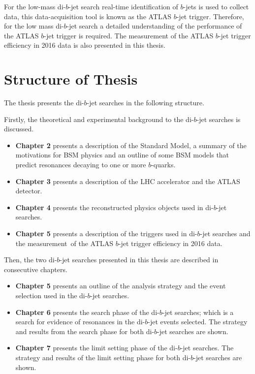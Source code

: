 For the low-mass di-$b$-jet search real-time identification of $b$-jets is used to collect data,
this data-acquisition tool is known as the ATLAS $b$-jet trigger.
Therefore, for the low mass di-$b$-jet search a detailed understanding of the performance of the ATLAS $b$-jet trigger is required.
The measurement of the ATLAS $b$-jet trigger efficiency in 2016 data is also presented in this thesis.

\section{Structure of Thesis}

The thesis presents the di-$b$-jet searches in the following structure.

\noindent
Firstly, the theoretical and experimental background to the di-$b$-jet searches is discussed.
\begin{itemize}[leftmargin=*]
\item\textbf{Chapter 2} presents a description of the Standard Model,
  a summary of the motivations for BSM physics and
  an outline of some BSM models that predict resonances
  decaying to one or more $b$-quarks.\vspace{0.5em}
\item\textbf{Chapter 3} presents a description of the LHC accelerator and the ATLAS detector.\vspace{0.5em}
\item\textbf{Chapter 4} presents the reconstructed physics objects used in di-$b$-jet searches. \vspace{0.5em}
\item\textbf{Chapter 5} presents a description of the triggers used in di-$b$-jet searches
  and the measurement~of the ATLAS $b$-jet trigger efficiency in 2016 data. \vspace{0.5em}
\end{itemize}
\noindent
Then, the two di-$b$-jet searches presented in this thesis are described in consecutive chapters.
\begin{itemize}[leftmargin=*]
\item\textbf{Chapter 5} presents an outline of the analysis strategy and the event selection used in the \mbox{di-$b$-jet} searches.\vspace{0.5em}
\item\textbf{Chapter 6} presents the search phase of the di-$b$-jet searches;
  which is a search for evidence of resonances in the di-$b$-jet events selected.
  The strategy and results from the search phase for both di-$b$-jet searches are shown.\vspace{0.5em}
\item\textbf{Chapter 7} presents the limit setting phase of the di-$b$-jet searches.
  The strategy and results of the limit setting phase for both di-$b$-jet searches are shown.\vspace{0.5em}
\end{itemize}
